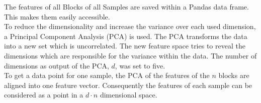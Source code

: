 The features of all Blocks of all Samples are saved within a Pandas data frame. This makes them easily accessible.\\
To reduce the dimensionality and increase the variance over each used dimension, a Principal Component Analysis (PCA) is used. The PCA transforms the data into a new set which is uncorrelated. The new feature space tries to reveal the dimensions which are responsible for the variance within the data. The number of dimensions as output of the PCA, $d$, was set to five.\\
To get a data point for one sample, the PCA of the features of the $n$ blocks are aligned into one feature vector. Consequently the features of each sample can be considered as a point in a $d \cdot n$ dimensional space.\\

